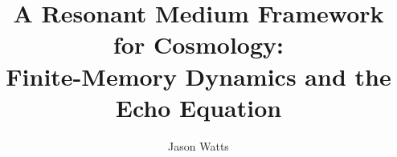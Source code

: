 \documentclass[a4paper,11pt]{article}
\title{A Resonant Medium Framework for Cosmology:\\ Finite-Memory Dynamics and the Echo Equation}
\author{Jason Watts}
\affiliation{Independent Researcher}
\begin{document}
\maketitle

\clearpage
\nocite{Planck2018,PantheonPlus2022,DESI2024_BAO_DR1,Watts2025_EchoEvidence}
\end{document}
